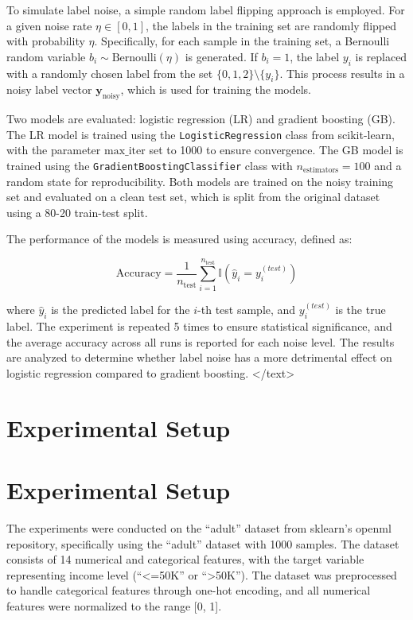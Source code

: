 \documentclass{article}
\begin{document}
To simulate label noise, a simple random label flipping approach is employed. For a given noise rate $ \eta \in [0, 1] $, the labels in the training set are randomly flipped with probability $ \eta $. Specifically, for each sample in the training set, a Bernoulli random variable $ b_i \sim \text{Bernoulli}(\eta) $ is generated. If $ b_i = 1 $, the label $ y_i $ is replaced with a randomly chosen label from the set $ \{0, 1, 2\} \setminus \{y_i\} $. This process results in a noisy label vector $ \mathbf{y}_{\text{noisy}} $, which is used for training the models.

Two models are evaluated: logistic regression (LR) and gradient boosting (GB). The LR model is trained using the \texttt{LogisticRegression} class from scikit-learn, with the parameter $ \text{max\_iter} $ set to 1000 to ensure convergence. The GB model is trained using the \texttt{GradientBoostingClassifier} class with $ n_{\text{estimators}} = 100 $ and a random state for reproducibility. Both models are trained on the noisy training set and evaluated on a clean test set, which is split from the original dataset using a 80-20 train-test split.

The performance of the models is measured using accuracy, defined as:

$$
\text{Accuracy} = \frac{1}{n_{\text{test}}} \sum_{i=1}^{n_{\text{test}}} \mathbb{I}( \hat{y}_i = y_i^{(test)} )
$$

where $ \hat{y}_i $ is the predicted label for the $ i $-th test sample, and $ y_i^{(test)} $ is the true label. The experiment is repeated 5 times to ensure statistical significance, and the average accuracy across all runs is reported for each noise level. The results are analyzed to determine whether label noise has a more detrimental effect on logistic regression compared to gradient boosting.
</text>
\section{Experimental Setup}
\section{Experimental Setup}

The experiments were conducted on the ``adult'' dataset from sklearn's openml repository, specifically using the ``adult'' dataset with 1000 samples. The dataset consists of 14 numerical and categorical features, with the target variable representing income level (``<=50K'' or ``>50K''). The dataset was preprocessed to handle categorical features through one-hot encoding, and all numerical features were normalized to the range [0, 1]. 
\end{document}
